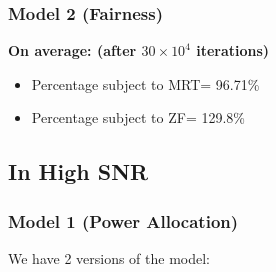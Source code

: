 \subsubsection{Model 2 (Fairness)}
\textbf{On average: (after $30 \times {10}^4$ iterations)}
    \begin{itemize}
        \item Percentage subject to MRT= 96.71\%
        \item Percentage subject to ZF= 129.8\%
    \end{itemize}

\subsection{In High SNR}
\subsubsection{Model 1 (Power Allocation)}
We have 2 versions of the model:
